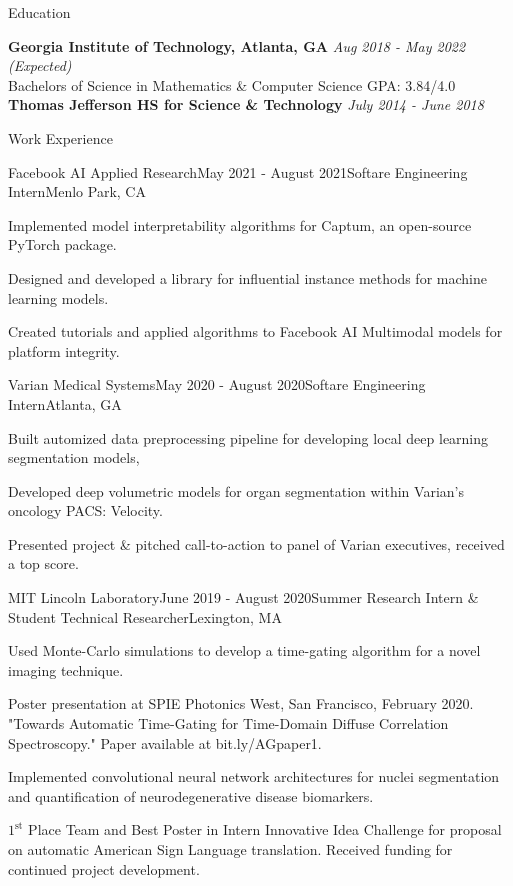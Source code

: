 \documentclass{template} %
\begin{document}

\begin{rSection}{Education}

{\bf Georgia Institute of Technology, Atlanta, GA} \hfill {\em Aug 2018 - May 2022 (Expected)}
\\ Bachelors of Science in Mathematics \& Computer Science \hfill  GPA: 3.84/4.0 \medskip
\\ {\bf Thomas Jefferson HS for Science \& Technology} \hfill {\em July 2014 - June 2018}
\end{rSection}


\begin{rSection}{Work Experience}

\begin{rSubsection}{Facebook AI Applied Research}{May 2021 - August 2021}{Softare Engineering Intern}{Menlo Park, CA}
\item Implemented model interpretability algorithms for Captum, an open-source PyTorch package.
\item Designed and developed a library for influential instance methods for machine learning models.
\item Created tutorials and applied algorithms to Facebook AI Multimodal models for platform integrity. 
\end{rSubsection}

\begin{rSubsection}{Varian Medical Systems}{May 2020 - August 2020}{Softare Engineering Intern}{Atlanta, GA}
\item Built automized data preprocessing pipeline for developing local deep learning segmentation models,
\item Developed deep volumetric models for organ segmentation within Varian's oncology PACS: Velocity.
\item Presented project \& pitched call-to-action to panel of Varian executives, received a top score.
\end{rSubsection}

\begin{rSubsection}{MIT Lincoln Laboratory}{June 2019 - August 2020}{Summer Research Intern \& Student Technical Researcher}{Lexington, MA}
\item Used Monte-Carlo simulations to develop a time-gating algorithm for a novel imaging technique.
\item Poster presentation at SPIE Photonics West, San Francisco, February 2020. "Towards Automatic Time-Gating for Time-Domain Diffuse Correlation Spectroscopy." Paper available at bit.ly/AGpaper1.
\item Implemented convolutional neural network architectures for nuclei segmentation and quantification of neurodegenerative disease biomarkers.
\item$1^{\text{st}}$ Place Team and Best Poster in Intern Innovative Idea Challenge for proposal on automatic American Sign Language translation. Received funding for continued project development.
\end{rSubsection}


\end{rSection}
\end{document}
